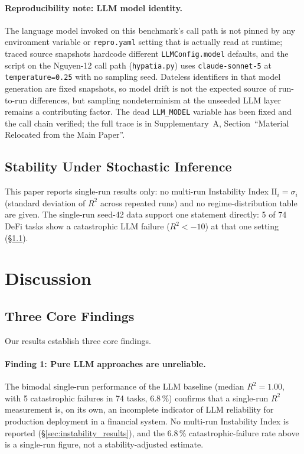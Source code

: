 \documentclass[twoside,11pt]{article}
\newcommand{\Rsq}{R^{2}}
\newcommand{\II}{\mathrm{II}}
\begin{document}
\paragraph{Reproducibility note: LLM model identity.} The language model invoked on this benchmark's call path is not pinned by any environment variable or \texttt{repro.yaml} setting that is actually read at runtime; traced source snapshots hardcode different \texttt{LLMConfig.model} defaults, and the script on the Nguyen-12 call path (\texttt{hypatia.py}) uses \texttt{claude-sonnet-5} at \texttt{temperature=0.25} with no sampling seed. Dateless identifiers in that model generation are fixed snapshots, so model drift is not the expected source of run-to-run differences, but sampling nondeterminism at the unseeded LLM layer remains a contributing factor. The dead \texttt{LLM\_MODEL} variable has been fixed and the call chain verified; the full trace is in Supplementary~A, Section~``Material Relocated from the Main Paper''.

\subsection{Stability Under Stochastic Inference}\label{subsec:stability-under-stochastic-inference}
\label{sec:instability_results}

This paper reports single-run results only: no multi-run Instability Index
$\II_i = \sigma_i$ (standard deviation of $\Rsq$ across repeated runs) and no
regime-distribution table are given. The single-run seed-42 data support one
statement directly: 5 of 74 DeFi tasks show a catastrophic LLM failure
($\Rsq < -10$) at that one setting (\S\ref{subsec:three-core-findings}).

\section{Discussion}
\label{sec:discussion}

\subsection{Three Core Findings}\label{subsec:three-core-findings}
\label{sec:disc_findings}

Our results establish three core findings.

\paragraph{Finding 1: Pure LLM approaches are unreliable.}
The bimodal single-run performance of the LLM baseline (median $\Rsq=1.00$,
with 5 catastrophic failures in 74 tasks, 6.8\,\%) confirms that a single-run
$\Rsq$ measurement is, on its own, an incomplete indicator of LLM reliability
for production deployment in a financial system. No multi-run Instability Index is reported (\S\ref{sec:instability_results}),
and the 6.8\,\% catastrophic-failure rate above is a
single-run figure, not a stability-adjusted estimate.
\end{document}
